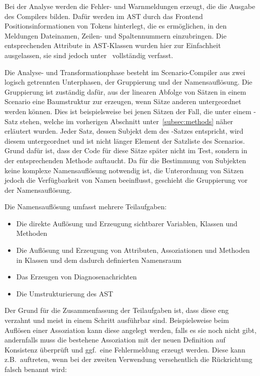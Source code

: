 Bei der Analyse werden die Fehler- und Warnmeldungen erzeugt, die die Ausgabe des Compilers bilden.
Dafür werden im AST durch das Frontend Positionsinformationen von Tokens hinterlegt, die es ermöglichen,
in den Meldungen Dateinamen, Zeilen- und Spaltennummern einzubringen.
Die entsprechenden Attribute in AST-Klassen wurden hier zur Einfachheit ausgelassen,
sie sind jedoch unter~\cite{gts-definitions} vollständig verfasst.

Die Analyse- und Transformationphase besteht im Scenario-Compiler aus zwei logisch getrennten Unterphasen,
der Gruppierung und der Namensauflösung.
Die Gruppierung ist zuständig dafür, aus der linearen Abfolge von Sätzen in einem Scenario eine Baumstruktur zur erzeugen,
wenn Sätze anderen untergeordnet werden können.
Dies ist beispielsweise bei jenen Sätzen der Fall, die unter einem -Satz stehen, welche im vorherigen Abschnitt unter~\ref{subsec:methods} näher erläutert wurden.
Jeder Satz, dessen Subjekt dem des -Satzes entspricht, wird diesem untergeordnet und ist nicht länger Element der Satzliste des Scenarios.
Grund dafür ist, dass der Code für diese Sätze später nicht im Test, sondern in der entsprechenden Methode auftaucht.
Da für die Bestimmung von Subjekten keine komplexe Namensauflösung notwendig ist, die Unterordnung von Sätzen jedoch die Verfügbarkeit von Namen beeinflusst, geschieht die Gruppierung vor der Namensauflösung.

Die Namensauflösung umfasst mehrere Teilaufgaben:

\begin{itemize}
    \item Die direkte Auflösung und Erzeugung sichtbarer Variablen, Klassen und Methoden
    \item Die Auflösung und Erzeugung von Attributen, Assoziationen und Methoden in Klassen und dem dadurch definierten Namensraum
    \item Das Erzeugen von Diagnosenachrichten
    \item Die Umstrukturierung des AST
\end{itemize}

Der Grund für die Zusammenfassung der Teilaufgaben ist, dass diese eng verzahnt und meist in einem Schritt ausführbar sind.
Beispielsweise beim Auflösen einer Assoziation kann diese angelegt werden, falls es sie noch nicht gibt, andernfalls muss die bestehene Assoziation mit der neuen Definition auf Konsistenz überprüft und ggf.\ eine Fehlermeldung erzeugt werden.
Diese kann z.B.\ auftreten, wenn bei der zweiten Verwendung versehentlich die Rückrichtung falsch benannt wird:

